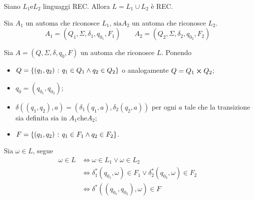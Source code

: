 \documentclass{subfiles}
\begin{document}
\begin{Theorem}
    Siano \(L_{1} \text{e} L_{2}\) linguaggi REC. Allora \(L = L_{1} \cup L_{2}\) è REC.

    \begin{Proof*}
        Sia \(A_{1}\) un automa che riconosce \(L_{1} \text{, sia} A_{2}\) un automa che riconosce \(L_{2}\).
        \[
            A_{1} = (Q_{1}, \Sigma, \delta_{1}, q_{0_{1}}, F_{1}) \qquad A_{2} = (Q_{2}, \Sigma, \delta_{2}, q_{0_{2}}, F_{2})
        \]

        \noindent Sia \(A = (Q, \Sigma, \delta, q_{0}, F)\) un automa che riconosce \(L\). Ponendo
        \begin{itemize}
            \item \(Q = \left\{(q_{1}, q_{2}) \operatorname{\: {:} \:} q_{1} \in Q_{1} \land q_{2} \in Q_{2}\right\}\) o analogamente \(Q = Q_{1} \cp Q_{2}\);
            \item \(q_{0} = (q_{0_{1}}, q_{0_{2}})\);
            \item \(\delta((q_{1}, q_{2}), a) = (\delta_{1}(q_{1}, a), \delta_{2}(q_{2}, a))\) per ogni \(a\) tale che la transizione sia definita sia in \(A_{1} \text{che} A_{2}\);
            \item \(F = \left\{(q_{1}, q_{2}) \operatorname{\: {:} \:} q_{1} \in F_{1} \land q_{2} \in F_{2}\right\}\).
        \end{itemize}

        \noindent Sia \(\omega \in L\), segue
        \[\begin{aligned}
                \omega \in L & \iff \omega \in L_{1} \lor \omega \in L_{2}                                                       \\
                             & \iff \delta_{1}^{*}(q_{0_{1}}, \omega) \in F_{1} \lor \delta_{2}^{*}(q_{0_{2}}, \omega) \in F_{2} \\
                             & \iff \delta^{*}((q_{0_{1}}, q_{0_{2}}), \omega) \in F
            \end{aligned}\]
    \end{Proof*}
\end{Theorem}
\end{document}
